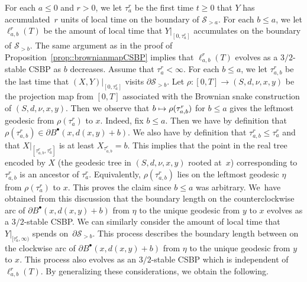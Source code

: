 \documentclass[10pt]{amsart}
\let\mathcal\mathscr
\newcommand\mto{\mathchoice{\longmapsto}{\mapsto}{\mapsto}{\mapsto}}
\newcommand{\sbullet}{{\scriptscriptstyle\bullet}}
\theoremstyle{plain}
\numberwithin{theorem}{section}
\theoremstyle{definition}
\newcommand{\snake}{{\mathcal S}}
\newcommand{\fb}[2]{B^\sbullet(#1,#2)}
\begin{document}
For each $a \leq 0$ and $r > 0$, we let $\tau_a^r$ be the first time $t \geq 0$ that $Y$ has accumulated~$r$ units of local time on the boundary of $\snake_{>a}$. For each $b \leq a$, we let $\ell_{a,b}^r(T)$ be the amount of local time that $Y|_{[0,\tau_a^r]}$ accumulates on the boundary of $\snake_{>b}$. The same argument as in the proof of Proposition~\ref{prop::brownianmapCSBP} implies that $\ell_{a,b}^r(T)$ evolves as a $3/2$-stable CSBP as $b$ decreases. Assume that $\tau_a^r < \infty$. For each $b \leq a$, we let $\tau_{a,b}^r$ be the last time that $(X,Y)|_{[0,\tau_a^r]}$ visits $\partial \snake_{> b}$. Let $\rho \colon [0,T] \to (S,d,\nu,x,y)$ be the projection map from $[0,T]$ associated with the Brownian snake construction of $(S,d,\nu,x,y)$. Then we observe that $b \mto \rho(\tau_{a,b}^r)$ for $b \leq a$ gives the leftmost geodesic from $\rho(\tau_a^r)$ to $x$. Indeed, fix $b \leq a$. Then we have by definition that $\rho(\tau_{a,b}^r) \in \partial \fb{x}{d(x,y)+b}$. We also have by definition that $\tau_{a,b}^r \leq \tau_a^r$ and that $X|_{[\tau_{a,b}^r,\tau_a^r]}$ is at least $X_{\tau_{a,b}^r} = b$. This implies that the point in the real tree encoded by $X$ (the geodesic tree in $(S,d,\nu,x,y)$ rooted at~$x$) corresponding to $\tau_{a,b}^r$ is an ancestor of $\tau_a^r$. Equivalently, $\rho(\tau_{a,b}^r)$ lies on the leftmost geodesic $\eta$ from $\rho(\tau_a^r)$ to $x$. This proves the claim since $b \leq a$ was arbitrary. We~have obtained from this discussion that the boundary length on the counterclockwise arc of $\partial \fb{x}{d(x,y)+b}$ from $\eta$ to the unique geodesic from $y$ to $x$ evolves as a $3/2$\nobreakdash-stable CSBP. We can similarly consider the amount of local time that $Y|_{[\tau_a^r,\infty)}$ spends on~$\partial \snake_{> b}$. This process describes the boundary length between on the clockwise arc of $\partial \fb{x}{d(x,y)+b}$ from $\eta$ to the unique geodesic from $y$ to $x$. This process also evolves as an $3/2$-stable CSBP which is independent of $\ell_{a,b}^r(T)$. By generalizing these considerations, we obtain the following.
\end{document}
